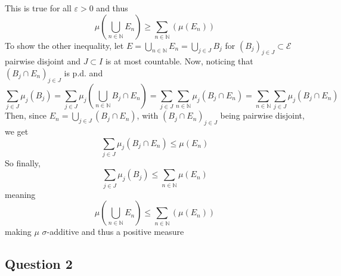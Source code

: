 \documentclass[letterpaper, 11pt]{article}
\newcommand{\1}{\mathds{1}}	%
\theoremstyle{definition}
\begin{document}
\begin{itemize}
    This is true for all $\varepsilon > 0$ and thus\[
     \mu \left ( \bigcup \limits _{n \in \mathbb{N}} E_n \right ) \ge \sum \limits _{n \in \mathbb{N}} (\mu (E_n)) 
    \]
To show the other inequality, let $E = \bigcup \limits _{n \in \mathbb{N}} E_n = \bigcup \limits _{j \in J} B_j$ for $(B_j)_{j \in J} \subset \mathcal{E}$ pairwise disjoint and $J \subset I$ is at most countable. Now, noticing that $(B_j \cap E_n)_{j \in J}$ is p.d. and  \[
\sum \limits _{ j\in J} \mu _j(B_j) = \sum \limits _{ j\in J} \mu _j \left (\bigcup \limits _{n\in \mathbb{N}}B_j \cap E_n \right) = \sum \limits _{ j\in J} \sum  _{n \in \mathbb{N}} \mu _j(B_j \cap E_n) = \sum \limits _{n \in \mathbb{N}} \sum \limits _{ j \in J} \mu _j(B_j \cap E_n) 
\]Then, since $E_n = \bigcup \limits _{j \in J} (B_j \cap E_n)$, with $(B_j \cap E_n)_{j \in J}$ being pairwise disjoint, we get \[\sum \limits _{j \in J} \mu _j (B_j \cap E_n) \le \mu (E_n)\]
So finally,
\[
\sum \limits _{j \in J} \mu _j (B_j) \le  \sum \limits _{n \in \mathbb{N}} \mu (E_n)
\]
meaning
 \[
\mu \left ( \bigcup \limits _{n \in \mathbb{N}} E_n \right ) \le \sum \limits _{n \in \mathbb{N}} (\mu (E_n)) 
\]
making $\mu$ $\sigma$-additive and thus a positive measure
    
    \end{itemize}
\subsection*{Question 2}
\end{document}
